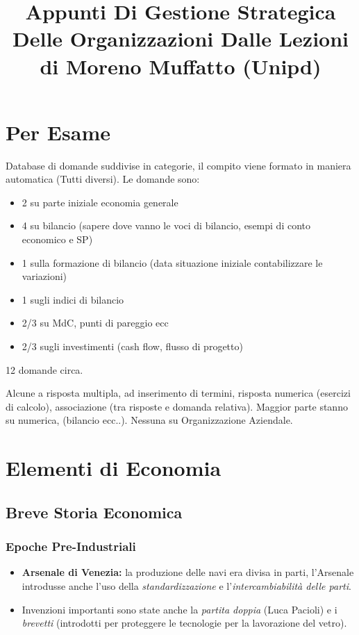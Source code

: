 \documentclass[a4paper,portrait,12pt]{article}
\theoremstyle{definition}
\begin{document}
\title{Appunti Di Gestione Strategica Delle Organizzazioni\vspace{1cm}
\large
Dalle Lezioni di Moreno Muffatto (Unipd)}

\maketitle
\date
\newpage

\tableofcontents



\newpage
\section{Per Esame}



Database di domande suddivise in categorie, il compito viene formato in maniera automatica (Tutti diversi).
Le domande sono:
\begin{itemize}
\item 2 su parte iniziale economia generale
\item 4 su bilancio (sapere dove vanno le voci di bilancio, esempi di conto economico e SP)
\item 1 sulla formazione di bilancio (data situazione iniziale contabilizzare le variazioni)
\item 1 sugli indici di bilancio
\item 2/3 su MdC, punti di pareggio ecc
\item 2/3 sugli investimenti (cash flow, flusso di progetto)
\end{itemize}

12 domande circa.

Alcune a risposta multipla, ad inserimento di termini, risposta numerica (esercizi di calcolo), associazione (tra risposte e domanda relativa).
Maggior parte stanno su numerica, (bilancio ecc..).
Nessuna su Organizzazione Aziendale.



\newpage
\section{Elementi di Economia}


\subsection{Breve Storia Economica}

\subsubsection{Epoche Pre-Industriali}
\begin{itemize}
\item \textbf{Arsenale di Venezia:} la produzione delle navi era divisa in parti, l'Arsenale introdusse anche l'uso della \emph{standardizzazione} e l'\emph{intercambiabilità delle parti}.
\item Invenzioni importanti sono state anche la \emph{partita doppia} (Luca Pacioli) e i \emph{brevetti} (introdotti per proteggere le tecnologie per la lavorazione del vetro). 
\end{itemize}
\end{document}
